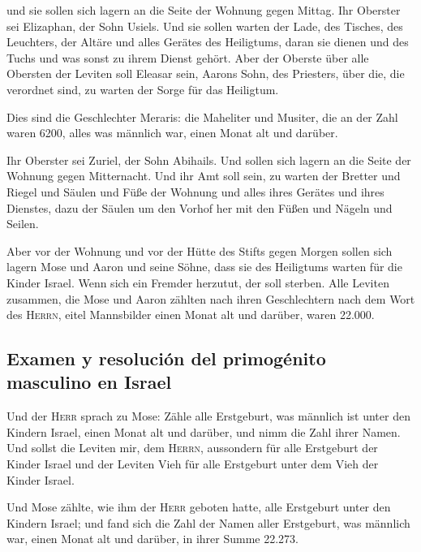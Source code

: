  und sie sollen sich lagern an die Seite der Wohnung
gegen Mittag.  Ihr Oberster sei Elizaphan, der Sohn
Usiels.  Und sie sollen warten der Lade, des Tisches, des
Leuchters, der Altäre und alles Gerätes des Heiligtums, daran sie dienen
und des Tuchs und was sonst zu ihrem Dienst gehört.  Aber
der Oberste über alle Obersten der Leviten soll Eleasar sein, Aarons
Sohn, des Priesters, über die, die verordnet sind, zu warten der Sorge
für das Heiligtum.

 Dies sind die Geschlechter Meraris: die Maheliter und
Musiter,  die an der Zahl waren 6200, alles was männlich
war, einen Monat alt und darüber.

 Ihr Oberster sei Zuriel, der Sohn Abihails. Und sollen
sich lagern an die Seite der Wohnung gegen Mitternacht. 
Und ihr Amt soll sein, zu warten der Bretter und Riegel und Säulen und
Füße der Wohnung und alles ihres Gerätes und ihres Dienstes,
 dazu der Säulen um den Vorhof her mit den Füßen und
Nägeln und Seilen.

 Aber vor der Wohnung und vor der Hütte des Stifts gegen
Morgen sollen sich lagern Mose und Aaron und seine Söhne, dass sie des
Heiligtums warten für die Kinder Israel. Wenn sich ein Fremder herzutut,
der soll sterben.  Alle Leviten zusammen, die Mose und
Aaron zählten nach ihren Geschlechtern nach dem Wort des \textsc{Herrn},
eitel Mannsbilder einen Monat alt und darüber, waren 22.000.

\hypertarget{examen-y-resoluciuxf3n-del-primoguxe9nito-masculino-en-israel}{%
\subsection{Examen y resolución del primogénito masculino en
Israel}\label{examen-y-resoluciuxf3n-del-primoguxe9nito-masculino-en-israel}}

 Und der \textsc{Herr} sprach zu Mose: Zähle alle
Erstgeburt, was männlich ist unter den Kindern Israel, einen Monat alt
und darüber, und nimm die Zahl ihrer Namen.  Und sollst
die Leviten mir, dem \textsc{Herrn}, aussondern für alle Erstgeburt der
Kinder Israel und der Leviten Vieh für alle Erstgeburt unter dem Vieh
der Kinder Israel.

 Und Mose zählte, wie ihm der \textsc{Herr} geboten
hatte, alle Erstgeburt unter den Kindern Israel;  und
fand sich die Zahl der Namen aller Erstgeburt, was männlich war, einen
Monat alt und darüber, in ihrer Summe 22.273.

